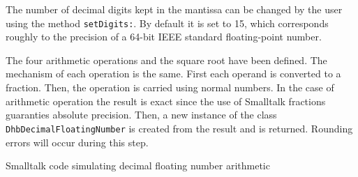 The number of decimal digits kept in the mantissa can be changed
by the user using the method {\tt setDigits:}. By default it is
set to 15, which corresponds roughly to the precision of a 64-bit
IEEE standard floating-point number.

The four arithmetic operations and the square root have been
defined. The mechanism of each operation is the same. First each
operand is converted to a fraction. Then, the operation is carried
using normal numbers. In the case of arithmetic operation the
result is exact since the use of Smalltalk fractions guaranties
absolute precision. Then, a new instance of the class {\tt
DhbDecimalFloatingNumber} is created from the result and is
returned. Rounding errors will occur during this step.

\begin{listing} Smalltalk code
simulating decimal floating number arithmetic \label{ls:testst}

\end{listing}
